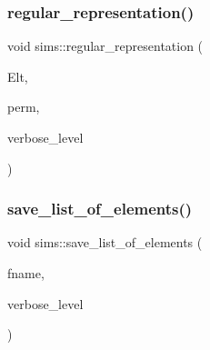\mbox{\label{classsims_ac445ae3fa3933272cbc36a711a1de17f}} 
\subsubsection{\texorpdfstring{regular\+\_\+representation()}{regular\_representation()}}
{\footnotesize\ttfamily void sims\+::regular\+\_\+representation (\begin{DoxyParamCaption}\item[{\mbox{\hyperlink{galois_8h_a09fddde158a3a20bd2dcadb609de11dc}{I\+NT}} $\ast$}]{Elt,  }\item[{\mbox{\hyperlink{galois_8h_a09fddde158a3a20bd2dcadb609de11dc}{I\+NT}} $\ast$}]{perm,  }\item[{\mbox{\hyperlink{galois_8h_a09fddde158a3a20bd2dcadb609de11dc}{I\+NT}}}]{verbose\+\_\+level }\end{DoxyParamCaption})}

\mbox{\label{classsims_aa0b6be1174d616f816b74076ba8b1edd}} 
\subsubsection{\texorpdfstring{save\+\_\+list\+\_\+of\+\_\+elements()}{save\_list\_of\_elements()}}
{\footnotesize\ttfamily void sims\+::save\+\_\+list\+\_\+of\+\_\+elements (\begin{DoxyParamCaption}\item[{\mbox{\hyperlink{galois_8h_ab6cc7b4aeb6ea31aba2b3fbfc83ff5e6}{B\+Y\+TE}} $\ast$}]{fname,  }\item[{\mbox{\hyperlink{galois_8h_a09fddde158a3a20bd2dcadb609de11dc}{I\+NT}}}]{verbose\+\_\+level }\end{DoxyParamCaption})}

\mbox{\label{classsims_a4d902cab732ddf9f60788dda85b0a775}} 
